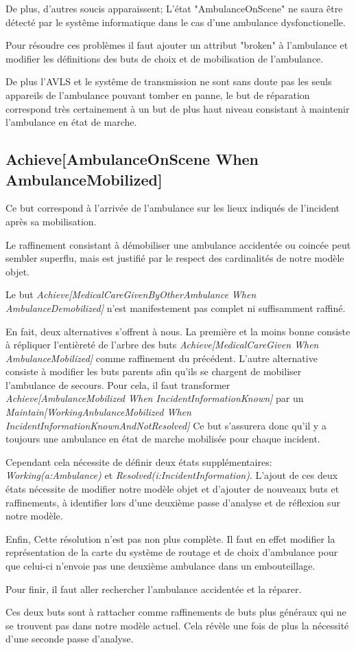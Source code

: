 	De plus, d'autres soucis apparaissent; L'état "AmbulanceOnScene"
	ne saura être détecté par le systême informatique dans le
	cas d'une ambulance dysfonctionelle.

	Pour résoudre ces problèmes il faut ajouter un attribut "broken"
	à l'ambulance et modifier les définitions des buts de choix et
	de mobilisation de l'ambulance. 

	De plus l'AVLS et le systême de transmission ne sont sans doute pas
	les seuls appareils de l'ambulance pouvant tomber en panne, le but
	de réparation correspond très certainement à un but de
	plus haut niveau consistant à maintenir l'ambulance en état de marche.

\subsection{Achieve[AmbulanceOnScene When AmbulanceMobilized]}
	Ce but correspond à l'arrivée de l'ambulance sur les lieux indiqués
	de l'incident après sa mobilisation.
	
	Le raffinement consistant à démobiliser une ambulance accidentée ou
	coincée peut sembler superflu, mais est justifié par le respect des
	cardinalités de notre modèle objet. 

	Le but \emph{Achieve[MedicalCareGivenByOtherAmbulance When AmbulanceDemobilized]}
	n'est manifestement pas complet ni suffisamment raffiné.
	
	En fait, deux alternatives s'offrent à nous. La première et la moins bonne
	consiste à répliquer l'entièreté de l'arbre des buts 
	\emph{Achieve[MedicalCareGiven When AmbulanceMobilized]}
	comme raffinement du précédent. L'autre alternative consiste à modifier
	les buts parents afin qu'ils se chargent de mobiliser l'ambulance de 
	secours. Pour cela, il faut transformer 
	\emph{Achieve[AmbulanceMobilized When IncidentInformationKnown]}
	par un \emph{Maintain[WorkingAnbulanceMobilized When IncidentInformationKnownAndNotResolved]}
	Ce but s'assurera donc qu'il y a toujours une ambulance en état de marche 
	mobilisée pour chaque incident. 
	
	Cependant cela nécessite de définir deux états supplémentaires:  
	\emph{Working(a:Ambulance)} et \emph{Resolved(i:IncidentInformation)}. 
	L'ajout de ces deux états nécessite de modifier notre modèle objet 
	et d'ajouter de nouveaux buts et raffinements, à identifier lors d'une 
	deuxième passe d'analyse et de réflexion sur notre modèle.

	Enfin, Cette résolution n'est pas non plus complète. Il faut en effet
	modifier la représentation de la carte du système de routage et de choix
	d'ambulance pour que celui-ci n'envoie pas une deuxième ambulance dans
	un embouteillage. 

	Pour finir, il faut aller rechercher l'ambulance accidentée et la 
	réparer. 

	Ces deux buts sont à rattacher comme raffinements de buts plus généraux
	qui ne se trouvent pas dans notre modèle actuel. Cela révèle une fois de
	plus la nécessité d'une seconde passe d'analyse.

